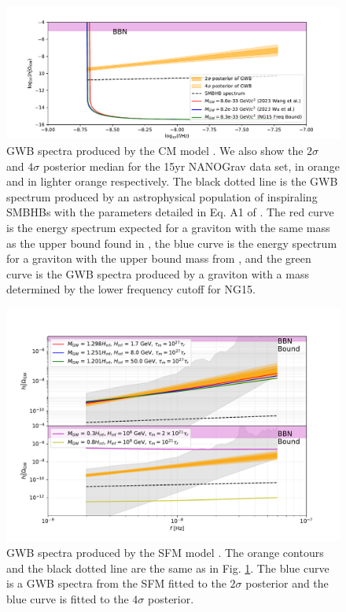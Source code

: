 \begin{figure}
\includegraphics[width=\textwidth]{fig/fig1.pdf}
\caption{
GWB spectra produced by the CM model \cite{Gumrukcuoglu:2012}. We also show the $2\sigma$ and $4\sigma$ posterior median for the 15yr NANOGrav data set, in orange and in lighter orange respectively. The black dotted line is the GWB spectrum produced by an astrophysical population of inspiraling SMBHBs with the parameters detailed in Eq. A1 of \cite{Afzal:2023}. The red curve is the energy spectrum expected for a graviton with the same mass as the upper bound found in \cite{Wang:2023}, the blue curve is the energy spectrum for a graviton with the upper bound mass from \cite{Wu:2023}, and the green curve is the GWB spectra produced by a graviton with a mass determined by the lower frequency cutoff for NG15.}\label{fig:GWB_CM}
\end{figure}

\begin{figure}
\includegraphics[width=\textwidth]{fig/fig3.pdf}
\caption{
GWB spectra produced by the SFM model \cite{Fujita:2018}. The orange contours and the black dotted line are the same as in Fig. \ref{fig:GWB_CM}. The blue curve is a GWB spectra from the SFM fitted to the $2\sigma$ posterior and the blue curve is fitted to the $4\sigma$ posterior. }\label{fig:GWB_SFM}
\end{figure}



